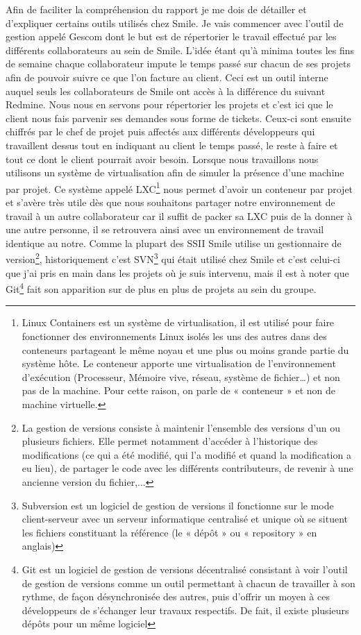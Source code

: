 \documentclass[a4paper,11pt,twoside]{report}
\begin{document}
  Afin de faciliter la compréhension du rapport je me dois de détailler et d'expliquer certains outils utilisés chez Smile. Je vais commencer avec l'outil de gestion appelé Gescom dont le but est de répertorier le travail effectué par les différents collaborateurs au sein de Smile. L'idée étant qu'à minima toutes les fins de semaine chaque collaborateur impute le temps passé sur chacun de ses projets afin de pouvoir suivre ce que l'on facture au client. Ceci est un outil interne auquel seuls les collaborateurs de Smile ont accès à la différence du suivant Redmine. Nous nous en servons pour répertorier les projets et c'est ici que le client nous fais parvenir ses demandes sous forme de tickets. Ceux-ci sont ensuite chiffrés par le chef de projet puis affectés aux différents développeurs qui travaillent dessus tout en indiquant au client le temps passé, le reste à faire et tout ce dont le client pourrait avoir besoin. Lorsque nous travaillons nous utilisons un système de virtualisation afin de simuler la présence d'une machine par projet. Ce système appelé LXC\footnote{Linux Containers est un système de virtualisation, il est utilisé pour faire fonctionner des environnements Linux isolés les uns des autres dans des conteneurs partageant le même noyau et une plus ou moins grande partie du système hôte. Le conteneur apporte une virtualisation de l'environnement d'exécution (Processeur, Mémoire vive, réseau, système de fichier…) et non pas de la machine. Pour cette raison, on parle de « conteneur » et non de machine virtuelle.} nous permet d'avoir un conteneur par projet et s'avère très utile dès que nous souhaitons partager notre environnement de travail à un autre collaborateur car il suffit de packer sa LXC puis de la donner à une autre personne, il se retrouvera ainsi avec un environnement de travail identique au notre. Comme la plupart des SSII Smile utilise un gestionnaire de version\footnote{La gestion de versions consiste à maintenir l'ensemble des versions d'un ou plusieurs fichiers. Elle permet notamment d'accéder à l'historique des modifications (ce qui a été modifié, qui l'a modifié et quand la modification a eu lieu), de partager le code avec les différents contributeurs, de revenir à une ancienne version du fichier,...}, historiquement c'est SVN\footnote{Subversion est un logiciel de gestion de versions il fonctionne sur le mode client-serveur avec un serveur informatique centralisé et unique où se situent les fichiers constituant la référence (le « dépôt » ou « repository » en anglais)} qui était utilisé chez Smile et c'est celui-ci que j'ai pris en main dans les projets où je suis intervenu, mais il est à noter que Git\footnote{Git est un logiciel de gestion de versions décentralisé consistant à voir l'outil de gestion de versions comme un outil permettant à chacun de travailler à son rythme, de façon désynchronisée des autres, puis d'offrir un moyen à ces développeurs de s'échanger leur travaux respectifs. De fait, il existe plusieurs dépôts pour un même logiciel} fait son apparition sur de plus en plus de projets au sein du groupe.
  
\end{document}

